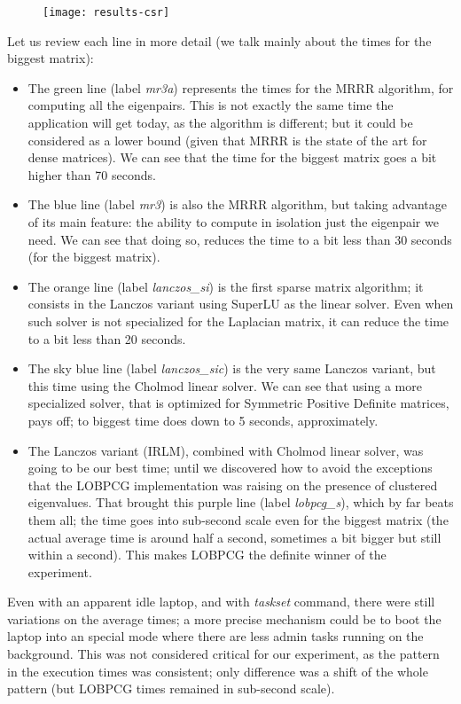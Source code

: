\begin{figure}[H]
  \centering
  \texttt{[image: results-csr]}
\end{figure}

Let us review each line in more detail (we talk mainly about the times
for the biggest matrix):

\begin{itemize}
\item The green line (label \emph{mr3a}) represents the times for the
  MRRR algorithm, for 
  computing all the eigenpairs. This is not exactly the same time
  the application will get today, as the algorithm is different; but
  it could be considered as a lower bound (given that MRRR is the
  state of the art for dense matrices). We can see that the time for
  the biggest matrix goes a bit higher than 70 seconds.
\item The blue line (label \emph{mr3}) is also the MRRR algorithm, but
  taking advantage of its main feature: the ability to compute in
  isolation just the eigenpair we need. We can see that doing so,
  reduces the time to a bit less than 30 seconds (for the biggest
  matrix).
\item The orange line (label \emph{lanczos\_si}) is the first sparse
  matrix algorithm; it consists in the Lanczos variant using SuperLU
  as the linear solver. Even when such solver is not specialized for
  the Laplacian matrix, it can reduce the time to a bit less than 20
  seconds.
  \item The sky blue line (label \emph{lanczos\_sic}) is the very same
    Lanczos variant, but this time using the Cholmod linear solver. We
    can see that using a more specialized solver, that is optimized
    for Symmetric Positive Definite matrices, pays off; to biggest
    time does down to 5 seconds, approximately.
  \item The Lanczos variant (IRLM), combined with Cholmod linear
    solver, was going to be our best time; until we discovered how to
    avoid the exceptions that the LOBPCG implementation was raising on
    the presence of clustered eigenvalues. That brought this purple
    line (label \emph{lobpcg\_s}), which by far beats them all; the time
    goes into sub-second scale even for the biggest matrix (the actual
    average time is around half a second, sometimes a bit bigger but
    still within a second). This makes LOBPCG the definite winner of
    the experiment. 
\end{itemize}

Even with an apparent idle laptop,
  and with \emph{taskset} command, there were still variations on the
  average times; a more precise mechanism could be to boot the laptop
  into an special mode where there are less admin tasks running on the
background. This was not considered critical for our experiment, as
the pattern in the execution times was consistent; only difference was
a shift of the whole pattern (but LOBPCG times remained in sub-second
scale). \\ 

